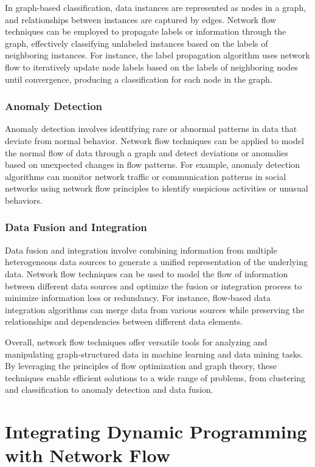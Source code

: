 \documentclass[12pt]{book} %
\begin{document}
In graph-based classification, data instances are represented as nodes in a graph, and relationships between instances are captured by edges. Network flow techniques can be employed to propagate labels or information through the graph, effectively classifying unlabeled instances based on the labels of neighboring instances. For instance, the label propagation algorithm uses network flow to iteratively update node labels based on the labels of neighboring nodes until convergence, producing a classification for each node in the graph.

\subsubsection{Anomaly Detection}

Anomaly detection involves identifying rare or abnormal patterns in data that deviate from normal behavior. Network flow techniques can be applied to model the normal flow of data through a graph and detect deviations or anomalies based on unexpected changes in flow patterns. For example, anomaly detection algorithms can monitor network traffic or communication patterns in social networks using network flow principles to identify suspicious activities or unusual behaviors.

\subsubsection{Data Fusion and Integration}

Data fusion and integration involve combining information from multiple heterogeneous data sources to generate a unified representation of the underlying data. Network flow techniques can be used to model the flow of information between different data sources and optimize the fusion or integration process to minimize information loss or redundancy. For instance, flow-based data integration algorithms can merge data from various sources while preserving the relationships and dependencies between different data elements.

Overall, network flow techniques offer versatile tools for analyzing and manipulating graph-structured data in machine learning and data mining tasks. By leveraging the principles of flow optimization and graph theory, these techniques enable efficient solutions to a wide range of problems, from clustering and classification to anomaly detection and data fusion.

\section{Integrating Dynamic Programming with Network Flow}
\end{document}
